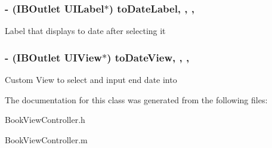 \subsubsection[{\texorpdfstring{to\+Date\+Label}{toDateLabel}}]{\setlength{\rightskip}{0pt plus 5cm}-\/ (I\+B\+Outlet U\+I\+Label$\ast$) to\+Date\+Label\hspace{0.3cm}{\ttfamily [read]}, {\ttfamily [write]}, {\ttfamily [nonatomic]}, {\ttfamily [retain]}}\hypertarget{interface_view_controller_a4f994d8faa0e33684ceabda9869199b6}{}\label{interface_view_controller_a4f994d8faa0e33684ceabda9869199b6}
Label that displays to date after selecting it 
\subsubsection[{\texorpdfstring{to\+Date\+View}{toDateView}}]{\setlength{\rightskip}{0pt plus 5cm}-\/ (I\+B\+Outlet U\+I\+View$\ast$) to\+Date\+View\hspace{0.3cm}{\ttfamily [read]}, {\ttfamily [write]}, {\ttfamily [nonatomic]}, {\ttfamily [retain]}}\hypertarget{interface_view_controller_af6950612beceef831120523fc882a421}{}\label{interface_view_controller_af6950612beceef831120523fc882a421}
Custom View to select and input end date into 

The documentation for this class was generated from the following files\+:\begin{DoxyCompactItemize}
\item 
Book\+View\+Controller.\+h\item 
Book\+View\+Controller.\+m\end{DoxyCompactItemize}
